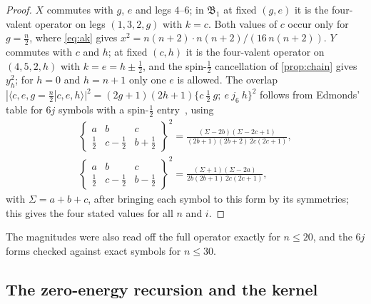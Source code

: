 \begin{proof}
$X$ commutes with $g$, $e$ and legs $4$--$6$; in $\mathfrak B_1$ at fixed $(g,e)$ it is the
four-valent operator on legs $(1,3,2,g)$ with $k=c$. Both values of $c$ occur only for
$g=\frac n2$, where \eqref{eq:ak} gives $x^2=n(n+2)\cdot n(n+2)/(16\,n(n+2))$. $Y$ commutes with
$c$ and $h$; at fixed $(c,h)$ it is the four-valent operator on $(4,5,2,h)$ with $k=e=h\pm\frac12$,
and the spin-$\frac12$ cancellation of \cref{prop:chain} gives $y_h^2$; for $h=0$ and $h=n+1$
only one $e$ is allowed. The overlap $|\langle c,e,g=\frac n2|c,e,h\rangle|^2=(2g+1)(2h+1)
\{c\ \tfrac12\ g;\ e\ j_6\ h\}^2$ follows from Edmonds' table for $6j$ symbols with a
spin-$\frac12$ entry~\cite[Table~5]{Edmonds}, using
\begin{gather*}
  \begin{Bmatrix}a&b&c\\\frac12&c-\frac12&b+\frac12\end{Bmatrix}^2=\frac{(\Sigma-2b)(\Sigma-2c+1)}{(2b+1)(2b+2)\,2c(2c+1)},\\
  \begin{Bmatrix}a&b&c\\\frac12&c-\frac12&b-\frac12\end{Bmatrix}^2=\frac{(\Sigma+1)(\Sigma-2a)}{2b(2b+1)\,2c(2c+1)},
\end{gather*}
with $\Sigma=a+b+c$, after bringing each symbol to this form by its symmetries; this gives the four
stated values for all $n$ and $i$.
\end{proof}

The magnitudes were also read off the full operator exactly for $n\le20$, and the $6j$ forms
checked against exact symbols for $n\le30$.

\subsection{The zero-energy recursion and the kernel}

